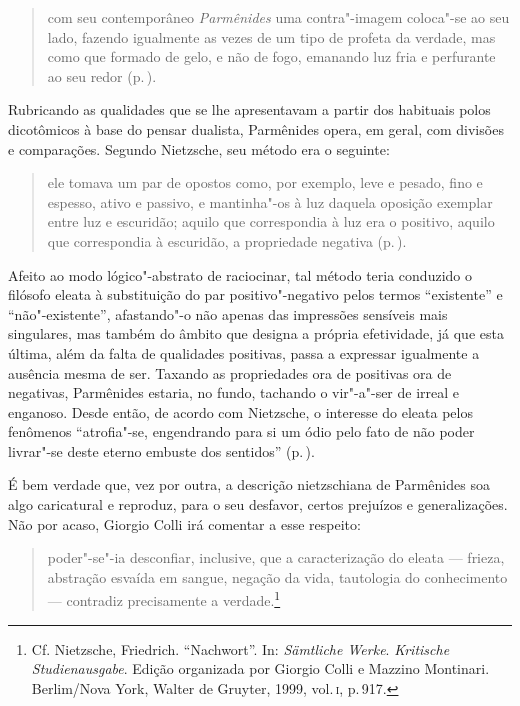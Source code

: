 \begin{quote} 
com seu contemporâneo \textit{Parmênides} uma
 contra"-imagem coloca"-se ao seu lado, fazendo igualmente as vezes de um
 tipo de profeta da verdade, mas como que formado de gelo, e não de fogo,
 emanando luz fria e perfurante ao seu redor (p.\,\pageref{comseucontemporaneo}).
\end{quote} 

Rubricando as qualidades que se lhe apresentavam a partir dos habituais polos
dicotômicos à base do pensar dualista, Parmênides opera, em geral, com
divisões e comparações. Segundo Nietzsche, seu método era o seguinte: 

\begin{quote} 
ele tomava um par de opostos como, por exemplo, leve e
 pesado, fino e espesso, ativo e passivo, e mantinha"-os à luz daquela
 oposição exemplar entre luz e escuridão; aquilo que correspondia à luz era o
 positivo, aquilo que correspondia à escuridão, a propriedade negativa
 (p.\,\pageref{eletomavaumpar}).
\end{quote} 

Afeito ao modo lógico"-abstrato de raciocinar, tal método teria conduzido o
filósofo eleata à substituição do par positivo"-negativo pelos termos
``existente'' e ``não"-existente'', afastando"-o não apenas das impressões
sensíveis mais singulares, mas também do âmbito que designa a própria
efetividade, já que esta última, além da falta de qualidades positivas, passa
a expressar igualmente a ausência mesma de ser. Taxando as propriedades ora
de positivas ora de negativas, Parmênides estaria, no fundo, tachando o
vir"-a"-ser de irreal e enganoso. Desde então, de acordo com Nietzsche, o
interesse do eleata pelos fenômenos ``atrofia"-se, engendrando para si um
ódio pelo fato de não poder livrar"-se deste eterno embuste dos sentidos''
(p.\,\pageref{odio}).

É bem verdade que, vez por outra, a descrição nietzschiana de Parmênides soa
algo caricatural e reproduz, para o seu desfavor, certos prejuízos e
generalizações. Não por acaso, Giorgio Colli irá comentar a esse respeito: 

\begin{quote} 
poder"-se"-ia desconfiar, inclusive, que a caracterização
 do	\label{colli} eleata --- frieza, abstração esvaída em sangue, negação da
 vida, tautologia do conhecimento --- contradiz precisamente a
 verdade.\footnote{ Cf. Nietzsche, Friedrich. ``Nachwort''. In:
\textit{Sämtliche Werke}. \textit{\mbox{Kritische} Studienausgabe}. Edição
 organizada por Giorgio Colli e Mazzino Montinari. Berlim/Nova York, Walter
 de Gruyter, 1999, vol.\,\textsc{i}, p.\,917.} 
\end{quote} 


